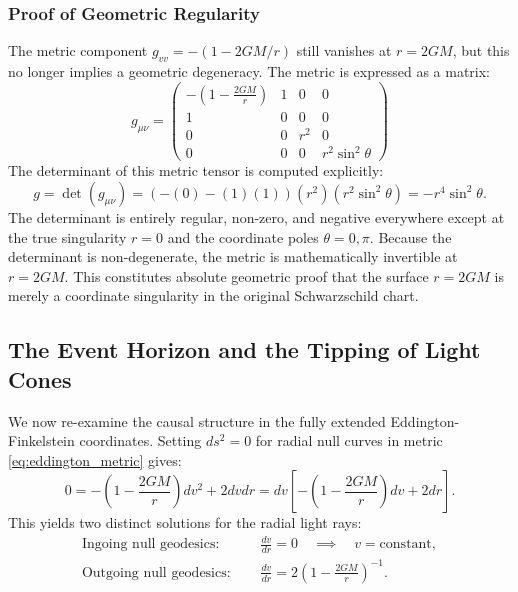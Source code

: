 \documentclass[11pt, a4paper]{report}
\begin{document}
\subsubsection*{Proof of Geometric Regularity}
The metric component $g_{vv} = -(1-2GM/r)$ still vanishes at $r=2GM$, but this no longer implies a geometric degeneracy. The metric is expressed as a matrix:
\begin{equation}
g_{\mu\nu} = 
\begin{pmatrix}
-\left(1-\frac{2GM}{r}\right) & 1 & 0 & 0 \\
1 & 0 & 0 & 0 \\
0 & 0 & r^{2} & 0 \\
0 & 0 & 0 & r^{2}\sin^{2}\theta
\end{pmatrix}
\end{equation}
The determinant of this metric tensor is computed explicitly:
\begin{equation}
g = \det(g_{\mu\nu}) = (-(0) - (1)(1))(r^{2})(r^{2}\sin^{2}\theta) = -r^{4}\sin^{2}\theta.
\end{equation}
The determinant is entirely regular, non-zero, and negative everywhere except at the true singularity $r=0$ and the coordinate poles $\theta = 0, \pi$. Because the determinant is non-degenerate, the metric is mathematically invertible at $r=2GM$. This constitutes absolute geometric proof that the surface $r=2GM$ is merely a coordinate singularity in the original Schwarzschild chart.

\subsection{The Event Horizon and the Tipping of Light Cones}

We now re-examine the causal structure in the fully extended Eddington-Finkelstein coordinates. Setting $ds^{2} = 0$ for radial null curves in metric \eqref{eq:eddington_metric} gives:
\begin{equation}
0 = -\left( 1 - \frac{2GM}{r} \right)dv^{2} + 2 dv dr = dv \left[ -\left( 1 - \frac{2GM}{r} \right)dv + 2dr \right].
\end{equation}
This yields two distinct solutions for the radial light rays:
\begin{align}
\text{Ingoing null geodesics: } \quad &\frac{dv}{dr} = 0 \quad \implies \quad v = \text{constant}, \\
\text{Outgoing null geodesics: } \quad &\frac{dv}{dr} = 2 \left( 1 - \frac{2GM}{r} \right)^{-1}.
\end{align}
\end{document}
